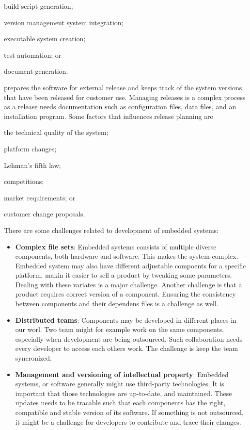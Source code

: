 \begin{description}
	\begin{inparaenum}
		\item build script generation;
		\item version management system integration;
		\item executable system creation;
		\item test automation; or
		\item document generation.
	\end{inparaenum}
	\item[Release management] prepares the software for external release and keeps track of the system versions that have been released for customer use. Managing releases is a complex process as a release needs documentation such as configuration files, data files, and an installation program. Some factors that influences release planning are
	\begin{inparaenum}
		\item the technical quality of the system;
		\item platform changes;
		\item Lehman's fifth law;
		\item competitions;
		\item market requirements; or
		\item customer change proposals.
	\end{inparaenum}
\end{description}

There are some challenges related to development of embedded systems\cite{Estublier:2000:SCM:336512.336576}:
\begin{itemize}
	\item \textbf{Complex file sets}: Embedded systems consists of multiple diverse components, both hardware and software. This makes the system complex. Embedded system may also have different adjustable compoents for a specific platform, makin it easier to sell a product by tweaking some parameters. Dealing with these variates is a major challenge. Another challenge is that a product requires correct version of a component. Ensuring the consistency between components and their dependens files is a challenge as well.
	\item \textbf{Distributed teams}: Components may be developed in different places in our worl. Two team might for example work on the same components, especially when development are being outsourced. Such collaboration needs every developer to access each others work. The challenge is keep the team syncronized. 
	\item \textbf{Management and versioning of intellectual property}: Embedded systems, or software generally might use third-party technologies. It is important that those technologies are up-to-date, and maintained. These updates needs to be tracable such that each components has the right, compatible and stable version of its software. If something is not outsourced, it might be a challenge for developers to contribute and trace their changes.
\end{itemize}

